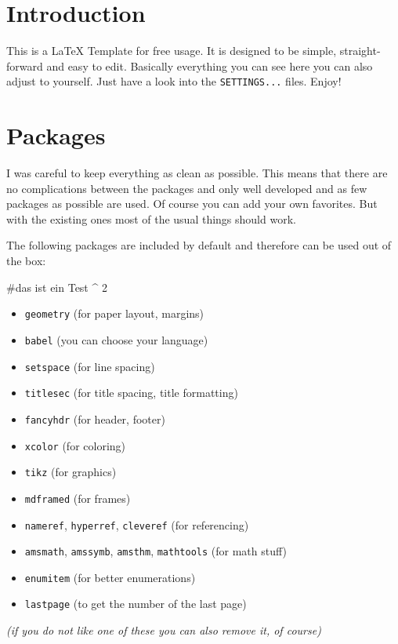 \documentclass[11pt, a4paper]{article}
\begin{document}
\section{Introduction}

This is a \LaTeX{} Template for free usage. It is designed to be simple, straight-forward and easy to edit.
Basically everything you can see here you can also adjust to yourself. Just have a look into the \texttt{SETTINGS...} files. Enjoy!

\section{Packages}

I was careful to keep everything as clean as possible. This means that there are no complications between the packages and only well developed and as few packages as possible are used. Of course you can add your own favorites. But with the existing ones most of the usual things should work.

The following packages are included by default and therefore can be used out of the box:

#das ist ein Test ^ 2


\begin{itemize}[noitemsep]
  \item \texttt{geometry} (for paper layout, margins)
  \item \texttt{babel} (you can choose your language)
  \item \texttt{setspace} (for line spacing)
  \item \texttt{titlesec} (for title spacing, title formatting)
  \item \texttt{fancyhdr} (for header, footer)
  \item \texttt{xcolor} (for coloring)
  \item \texttt{tikz} (for graphics)
  \item \texttt{mdframed} (for frames)
  \item \texttt{nameref}, \texttt{hyperref}, \texttt{cleveref} (for referencing)
  \item \texttt{amsmath}, \texttt{amssymb}, \texttt{amsthm}, \texttt{mathtools} (for math stuff)
  \item \texttt{enumitem} (for better enumerations)
  \item \texttt{lastpage} (to get the number of the last page)
\end{itemize}

\textsl{(if you do not like one of these you can also remove it, of course)}
\end{document}
